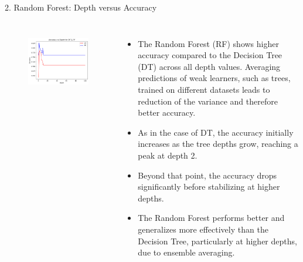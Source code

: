 \documentclass[aspectratio=169,xcolor=dvipsnames]{beamer}
\begin{document}
\begin{frame}{2. Random Forest: Depth versus Accuracy}

    \begin{columns}[c] %
        \begin{figure}
            \centering
            \includegraphics[width=1.15\linewidth]{out/plot10_DT_RF_accuracy_vs_depth.png}
            \label{fig:1}
        \end{figure}
        

        \begin{itemize}
            \scriptsize
            \item The Random Forest (RF) shows higher accuracy compared to the Decision Tree (DT) across all depth values.
            Averaging predictions of weak learners, such as trees, trained on different datasets leads to reduction of the
            variance and therefore better accuracy.
        
            \item As in the case of DT, the accuracy initially increases as the tree depths grow, 
            reaching a peak at depth 2.
        
            \item Beyond that point, the accuracy drops significantly before stabilizing at higher depths.
        
            \item The Random Forest performs better and generalizes more effectively than the Decision Tree, 
            particularly at higher depths, due to ensemble averaging.
        \end{itemize}


    \end{columns}
    
\end{frame}
\end{document}
